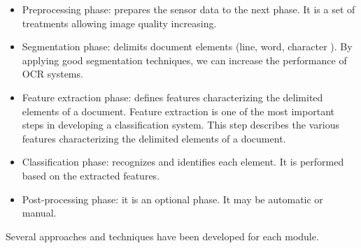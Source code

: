 \begin{itemize}
\item Preprocessing phase: prepares the sensor data to the next phase. It is a set of treatments allowing image quality increasing.
\item Segmentation phase: delimits document elements (line, word, character ). By applying good segmentation techniques, we can increase the performance of OCR systems.
\item Feature extraction phase: defines features characterizing the delimited elements of a document. Feature extraction is one of the most important steps in developing a classification system. This step describes the various features characterizing the delimited elements of a document.
\item Classification phase: recognizes and identifies each element. It is performed based on the extracted features.
\item Post-processing phase: it is an optional phase. It may be automatic or manual.
\end{itemize}
Several approaches and techniques have been developed for each module.